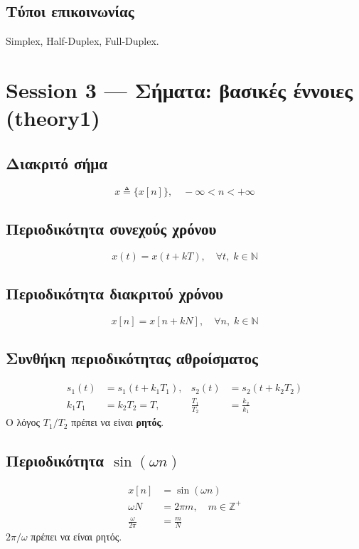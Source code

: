 \documentclass[11pt,a4paper]{article}
\begin{document}
\subsection{Τύποι επικοινωνίας}

Simplex, Half-Duplex, Full-Duplex.

\section{Session 3 — Σήματα: βασικές έννοιες (theory1)}

\subsection{Διακριτό σήμα}
\begin{equation}
x \triangleq \{x[n]\}, \quad -\infty < n < +\infty
\end{equation}

\subsection{Περιοδικότητα συνεχούς χρόνου}
\begin{equation}
x(t) = x(t + kT), \quad \forall t,\; k \in \mathbb{N}
\end{equation}

\subsection{Περιοδικότητα διακριτού χρόνου}
\begin{equation}
x[n] = x[n + kN], \quad \forall n,\; k \in \mathbb{N}
\end{equation}

\subsection{Συνθήκη περιοδικότητας αθροίσματος}
\begin{align}
s_1(t) &= s_1(t + k_1 T_1), &
s_2(t) &= s_2(t + k_2 T_2) \\
k_1 T_1 &= k_2 T_2 = T, &
\frac{T_1}{T_2} &= \frac{k_2}{k_1}
\end{align}
Ο λόγος $T_1/T_2$ πρέπει να είναι \textbf{ρητός}.

\subsection{Περιοδικότητα $\sin(\omega n)$}
\begin{align}
x[n] &= \sin(\omega n) \\
\omega N &= 2\pi m, \quad m \in \mathbb{Z}^+ \\
\frac{\omega}{2\pi} &= \frac{m}{N}
\end{align}
$2\pi/\omega$ πρέπει να είναι ρητός.
\end{document}

